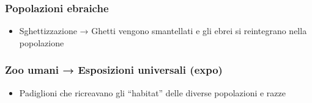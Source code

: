 \documentclass{article}
\begin{document}
\subsubsection{Popolazioni ebraiche}
\begin{itemize}
    \item Sghettizzazione → Ghetti vengono smantellati e gli ebrei si reintegrano nella popolazione
\end{itemize}

\subsubsection{Zoo umani → Esposizioni universali (expo)}
\begin{itemize}
    \item Padiglioni che ricreavano gli “habitat” delle diverse popolazioni e razze
\end{itemize}
\end{document}
